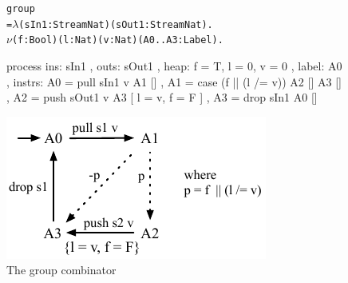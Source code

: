 \begin{figure}

\begin{center}
\begin{alltt}
           group 
             = \(\lambda\) (sIn1: Stream Nat) (sOut1: Stream Nat). 
               \(\nu\) (f: Bool) (l: Nat) (v: Nat) (A0..A3: Label).
\end{alltt}
\begin{code}
               process
               { ins:    { sIn1  }
               , outs:   { sOut1 }
               , heap:   { f = T, l = 0, v = 0 }
               , label:  A0
               , instrs: { A0 = pull sIn1 v          A1 []
                         , A1 = case (f || (l /= v)) A2 []  A3 []
                         , A2 = push sOut1 v         A3 [ l = v, f = F ]
                         , A3 = drop sIn1            A0 [] } }
\end{code}
\end{center}
\vspace{1em}
\includegraphics[scale=1.1]{figures/state-group.pdf}
\caption{The group combinator}
\label{fig:Process:Group}
\end{figure}


